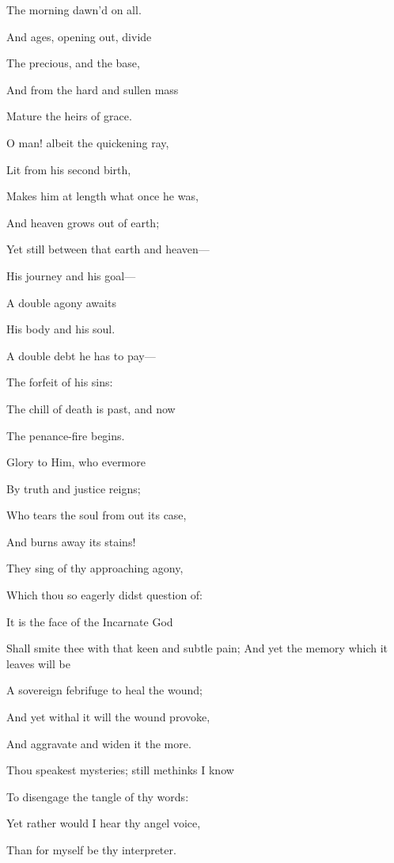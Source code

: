 The morning dawn'd on all.

And ages,
opening out, divide

The precious, and the base,

And
from the hard and sullen mass

Mature the heirs of grace. 

O man!
albeit the quickening ray,

Lit from his second birth,

Makes
him at length what once he was,

And heaven grows out of earth;

Yet still
between that earth and heaven—

His journey and his goal—

A
double agony awaits

His body and his soul.

A double
debt he has to pay—

The forfeit of his sins:

The
chill of death is past, and now

The penance-fire begins.

Glory to
Him, who evermore

By truth and justice reigns;

Who
tears the soul from out its case,

And burns away its stains!


They sing of thy approaching agony,

Which thou so eagerly didst question of:

It is the face of the Incarnate God

Shall smite thee with that keen and subtle pain; And yet the memory which it leaves will be

A sovereign febrifuge to heal the wound;

And yet withal it will the wound provoke,

And aggravate and widen it the more.


Thou speakest mysteries; still methinks I know

To disengage the tangle of thy words:

Yet rather would I hear thy angel voice,

Than for myself be thy interpreter.


